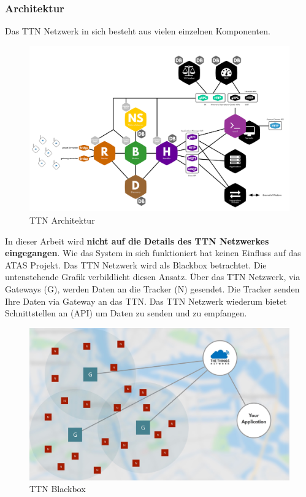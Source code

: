 \documentclass[11pt,english,german]{report}
\theoremstyle{definition}
\begin{document}
\subsubsection{Architektur}
Das TTN Netzwerk in sich besteht aus vielen einzelnen Komponenten.
\begin{figure}[H]
	\centering
	\includegraphics[width=\textwidth]{img/ttn_architecture.png}
	\caption[TTN Architektur]
	{TTN Architektur}
\end{figure}

\newpage
\noindent
In dieser Arbeit wird \textbf{nicht auf die Details des TTN Netzwerkes eingegangen}. Wie das System in sich funktioniert hat keinen Einfluss auf das ATAS Projekt. Das TTN Netzwerk wird als Blackbox betrachtet. Die untenstehende Grafik verbildlicht diesen Ansatz. Über das TTN Netzwerk, via Gateways (G), werden Daten an die Tracker (N) gesendet. Die Tracker senden Ihre Daten via Gateway an das TTN. Das TTN Netzwerk wiederum bietet Schnittstellen an (API) um Daten zu senden und zu empfangen.

\begin{figure}[H]
	\centering
	\includegraphics[width=\textwidth]{img/ttn-overview.jpg}
	\caption[TTN Blackbox]
	{TTN Blackbox}
\end{figure}
\noindent
\end{document}
